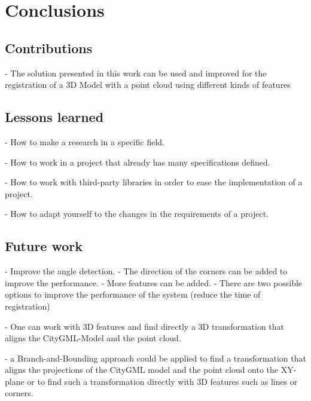 

    \chapter{Conclusions}

    \section{Contributions}
        - The solution presented in this work can be used and improved for the registration of a 3D Model with a point cloud using different kinds of features 

    \section{Lessons learned}
        - How to make a research in a specific field. \par
        - How to work in a project that already has many specifications defined. \par
        - How to work with third-party libraries in order to ease the implementation of a project. \par
        - How to adapt yourself to the changes in the requirements of a project. \par
    
    \section{Future work}
        - Improve the angle detection.
        - The direction of the corners can be added to improve the performance.
        - More features can be added.
        - There are two possible options to improve the performance of the system (reduce the time of registration) \par
        - One can work with 3D features and find directly a 3D transformation that aligns the CityGML-Model and the point cloud. \par
        - a Branch-and-Bounding \cite{Bazin_2013_abranchandbound,Breuel_2003_implementation,Brown_2015_globally,Brown_2019_afamily} approach could be applied 
        to find a transformation that aligns the projections of the CityGML model and the point cloud onto the XY-plane or to find such a transformation directly
        with 3D features such as lines or corners. \par

